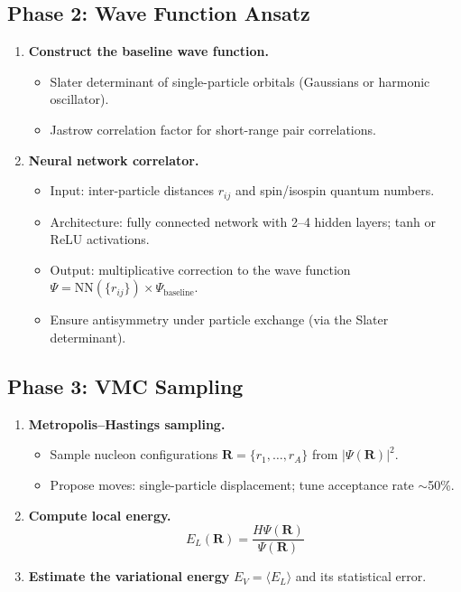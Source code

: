 \documentclass[11pt,a4paper]{article}
\begin{document}
\subsection{Phase 2: Wave Function Ansatz}
\begin{enumerate}[label=\textbf{2.\arabic*}]
  \item \textbf{Construct the baseline wave function.}
    \begin{itemize}
      \item Slater determinant of single-particle orbitals (Gaussians or harmonic oscillator).
      \item Jastrow correlation factor for short-range pair correlations.
    \end{itemize}
  \item \textbf{Neural network correlator.}
    \begin{itemize}
      \item Input: inter-particle distances $r_{ij}$ and spin/isospin quantum numbers.
      \item Architecture: fully connected network with 2--4 hidden layers; tanh or ReLU activations.
      \item Output: multiplicative correction to the wave function $\Psi = \text{NN}(\{r_{ij}\}) \times \Psi_{\text{baseline}}$.
      \item Ensure antisymmetry under particle exchange (via the Slater determinant).
    \end{itemize}
\end{enumerate}

\subsection{Phase 3: VMC Sampling}
\begin{enumerate}[label=\textbf{3.\arabic*}]
  \item \textbf{Metropolis--Hastings sampling.}
    \begin{itemize}
      \item Sample nucleon configurations $\mathbf{R} = \{r_1, \ldots, r_A\}$ from $|\Psi(\mathbf{R})|^2$.
      \item Propose moves: single-particle displacement; tune acceptance rate $\sim$50\%.
    \end{itemize}
  \item \textbf{Compute local energy.}
    \begin{equation*}
      E_L(\mathbf{R}) = \frac{H \Psi(\mathbf{R})}{\Psi(\mathbf{R})}
    \end{equation*}
  \item \textbf{Estimate the variational energy} $E_V = \langle E_L \rangle$ and its statistical error.
\end{enumerate}
\end{document}
